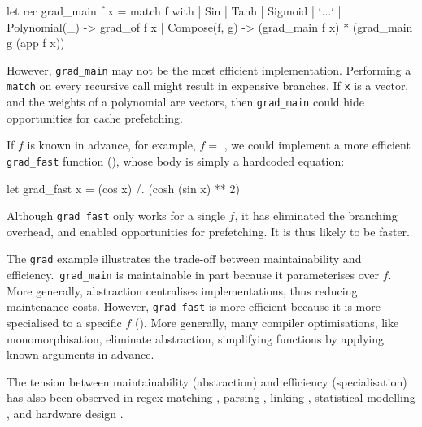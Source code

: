 \begin{code}
\begin{ocamllst}
let rec grad_main f x = match f with
  | Sin
  | Tanh
  | Sigmoid
  | `$\ldots$`
  | Polynomial(_) -> grad_of f x 
  | Compose(f, g) -> (grad_main f x) * (grad_main g (app f x))
\end{ocamllst}
\label{listing:ocaml-grad-main}
\end{code}

However, \texttt{grad_main} may not be the most efficient implementation. Performing a \texttt{match} on every recursive call might result in expensive branches. If \texttt{x} is a vector, and the weights of a polynomial are vectors, then \texttt{grad_main} could hide opportunities for cache prefetching.

If $f$ is known in advance, for example, $f =$ , we could implement a more efficient \texttt{grad_fast} function (), whose body is simply a hardcoded equation:

\begin{code}
\begin{ocamllst}
let grad_fast x = (cos x) /. (cosh (sin x) ** 2)
\end{ocamllst}
\label{listing:ocaml-grad-fast}
\end{code}    

Although \texttt{grad_fast} only works for a single $f$, it has eliminated the branching overhead, and enabled opportunities for prefetching. It is thus likely to be faster.

The \texttt{grad} example illustrates the trade-off between maintainability and efficiency.\ \texttt{grad_main} is maintainable in part because it parameterises over $f$. More generally, abstraction centralises implementations, thus reducing maintenance costs. However, \texttt{grad_fast} is more efficient because it is more specialised to a specific $f$ (). More generally, many compiler optimisations, like monomorphisation, eliminate abstraction, simplifying functions by applying known arguments in advance. 

The tension between maintainability (abstraction) and efficiency (specialisation) has also been observed in regex matching \citep{tratt-2008}, parsing \citep{yallop-2023}, linking \citep{servetto-2013}, statistical modelling \citep{wickham-2019}, and hardware design \citep{vandebon-2021}.

